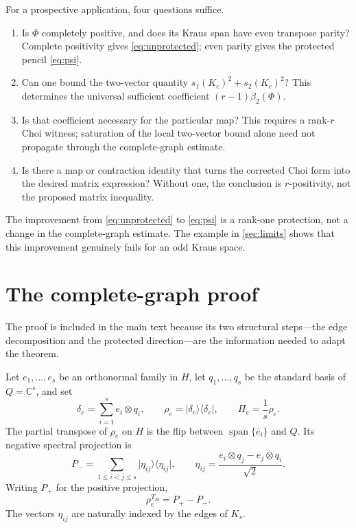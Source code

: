 \documentclass[11pt,reqno]{amsart}
\theoremstyle{remark}
\newcommand{\C}{\mathbb C}
\newcommand{\ketbra}[2]{\lvert #1\rangle\!\langle #2\rvert}
\begin{document}
For a prospective application, four questions suffice.

\begin{enumerate}
\item Is $\Phi$ completely positive, and does its Kraus span have even
transpose parity?  Complete positivity gives \cref{eq:unprotected}; even
parity gives the protected pencil \cref{eq:psi}.
\item Can one bound the two-vector quantity
$s_1(K_c)^2+s_2(K_c)^2$?  This determines the universal sufficient
coefficient $(r-1)\beta_2(\Phi)$.
\item Is that coefficient necessary for the particular map?  This requires a
rank-$r$ Choi witness; saturation of the local two-vector bound alone need not
propagate through the complete-graph estimate.
\item Is there a map or contraction identity that turns the corrected Choi
form into the desired matrix expression?  Without one, the conclusion is
$r$-positivity, not the proposed matrix inequality.
\end{enumerate}

The improvement from \cref{eq:unprotected} to \cref{eq:psi} is a rank-one
protection, not a change in the complete-graph estimate.  The example in
\cref{sec:limits} shows that this improvement genuinely fails for an odd
Kraus space.

\section{The complete-graph proof}
\label{sec:proof}

The proof is included in the main text because its two structural steps---the
edge decomposition and the protected direction---are the information needed
to adapt the theorem.

Let $e_1,\dots,e_s$ be an orthonormal family in $H$, let
$q_1,\dots,q_s$ be the standard basis of $Q=\C^s$, and set
\[
  \delta_e=\sum_{i=1}^s e_i\otimes q_i,\qquad
  \rho_e=\ketbra{\delta_e}{\delta_e},\qquad
  \Pi_e=\frac1s\rho_e.
\]
The partial transpose of $\rho_e$ on $H$ is the flip between
$\operatorname{span}\{\overline e_i\}$ and $Q$.  Its negative spectral
projection is
\begin{equation}
\label{eq:pminus}
  P_-=\sum_{1\le i<j\le s}\ketbra{\eta_{ij}}{\eta_{ij}},
  \qquad
  \eta_{ij}=
  \frac{\overline e_i\otimes q_j-\overline e_j\otimes q_i}{\sqrt2}.
\end{equation}
Writing $P_+$ for the positive projection,
\begin{equation}
\label{eq:flip}
  \rho_e^{T_H}=P_+-P_-.
\end{equation}
The vectors $\eta_{ij}$ are naturally indexed by the edges of $K_s$.
\end{document}

